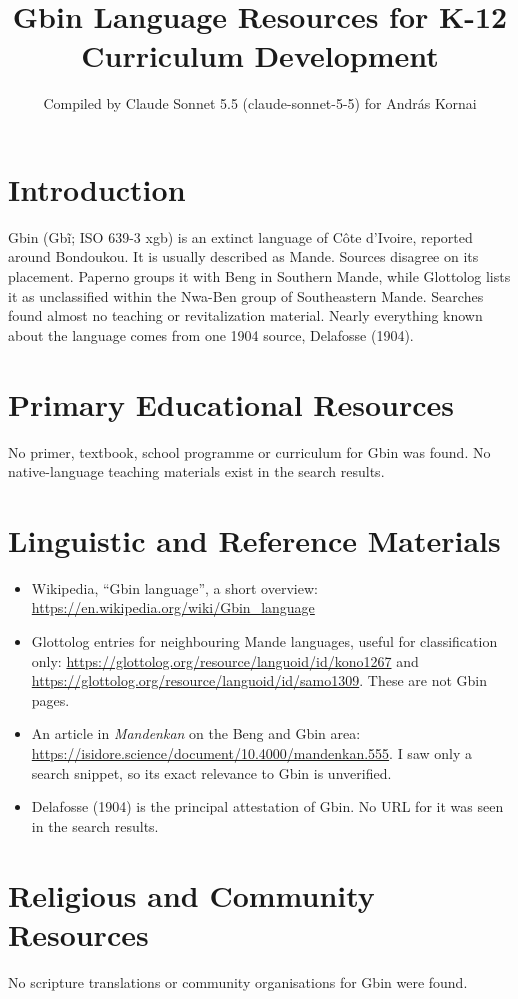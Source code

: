\documentclass[12pt]{article}
\title{Gbin Language Resources for K-12 Curriculum Development}
\author{Compiled by Claude Sonnet 5.5 (claude-sonnet-5-5) for Andr\'as Kornai}
\date{}
\begin{document}
\maketitle

\section{Introduction}
Gbin (Gb\~i; ISO 639-3 xgb) is an extinct language of C\^ote d'Ivoire, reported around Bondoukou. It is usually described as Mande. Sources disagree on its placement. Paperno groups it with Beng in Southern Mande, while Glottolog lists it as unclassified within the Nwa-Ben group of Southeastern Mande. Searches found almost no teaching or revitalization material. Nearly everything known about the language comes from one 1904 source, Delafosse (1904).

\section{Primary Educational Resources}
No primer, textbook, school programme or curriculum for Gbin was found. No native-language teaching materials exist in the search results.

\section{Linguistic and Reference Materials}
\begin{itemize}
\item Wikipedia, ``Gbin language'', a short overview: \url{https://en.wikipedia.org/wiki/Gbin_language}
\item Glottolog entries for neighbouring Mande languages, useful for classification only: \url{https://glottolog.org/resource/languoid/id/kono1267} and \url{https://glottolog.org/resource/languoid/id/samo1309}. These are not Gbin pages.
\item An article in \emph{Mandenkan} on the Beng and Gbin area: \url{https://isidore.science/document/10.4000/mandenkan.555}. I saw only a search snippet, so its exact relevance to Gbin is unverified.
\item Delafosse (1904) is the principal attestation of Gbin. No URL for it was seen in the search results.
\end{itemize}

\section{Religious and Community Resources}
No scripture translations or community organisations for Gbin were found.
\end{document}
